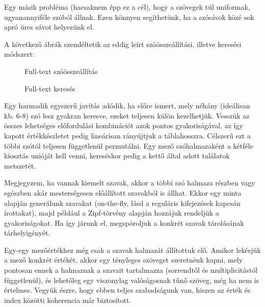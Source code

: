 \documentclass[
    parspace,
    noindent,
    nohyp,
]{elteiktdk}[2023/04/10]
\begin{document}
Egy másik probléma (hacsaknem épp ez a cél), hogy a szövegek túl uniformak, ugyanannyiféle szóból állnak.
Ezen könnyen segíthetünk, ha a szósávok közé sok apró üres sávot helyezünk el.

A következő ábrák szemléltetik az eddig leírt szóösszeállítási, illetve keresési módszert:

\begin{figure}[H]
  \centering
  \hspace*{\fill}
  \begin{minipage}[t]{0.42\textwidth}
    
    \caption{Full-text szóösszeállítás}
  \end{minipage}
  \hspace*{\fill}
  \begin{minipage}[t]{0.42\textwidth}
    
    \caption{Full-text keresés}
  \end{minipage}
  \hspace*{\fill}
\end{figure}

Egy harmadik egyszerű javítás adódik,
ha előre ismert, mely néhány (ideálisan kb. 6-8) szó lesz gyakran keresve,
ezeket teljesen külön kezelhetjük.
Vesszük az összes lehetséges előfordulási kombinációt azok pontos gyakoriságával,
az így kapott értékkészletet pedig lineárisan rányújtjuk a táblahosszra.
Célszerű ezt a többi szótól teljesen függetlenül permutálni.
Egy mező szóhalmazaként a kétféle kiosztás unióját kell venni,
kereséskor pedig a kettő által adott találatok metszetét.

Megjegyzem, ha vannak kiemelt szavak, akkor a többi szó halmaza részben vagy egészben
akár mesterségesen előállított szavakból is állhat.
Ekkor egy minta alapján generálunk szavakat
(on-the-fly, lásd a reguláris kifejezések kapcsán írottakat),
majd például a Zipf-törvény alapján hozzájuk rendeljük a gyakoriságokat.
Ha így járunk el, megspóroljuk a konkrét szavak tárolásának tárhelyigényét.

Egy-egy mezőértékhez még csak a szavak halmazát állítottuk elő.
Amikor lekérjük a mező konkrét értékét, akkor egy tényleges szöveget szeretnénk kapni,
mely pontosan ennek a halmaznak a szavait tartalmazza (sorrendtől és multiplicitástól függetlenül),
és lehetőleg egy viszonylag valóságosnak tűnő szöveg, még ha nem is értelmes.
Vegyük észre, hogy ebben teljes szabadságunk van,
hiszen az érték és index közötti koherencia már biztosított.
\end{document}
